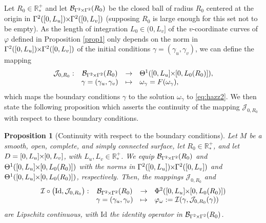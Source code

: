\documentclass{article}
\newcommand{\I}{\mathcal{I}}
\newcommand{\PLH}{{\mkern-1mu\times\mkern-1mu}}
\newcommand{\Times}{\PLH}
\newcommand{\R}{\mathbb{R}}
\newcommand{\surf}{M}
\newcommand{\J}{\mathcal{J}}
\newtheorem{proposition}[theorem]{Proposition}
\theoremstyle{remark}
\theoremstyle{prpart}
\newcommand{\B}{\mathcal{B}}
\newcommand{\Id}{\mathrm{Id}}
\begin{document}
Let $R_0\in\R^+_\ast$ and let $\B_{\Gamma^2\Times \Gamma^2}(R_0)$ be the closed ball of radius $R_0$ centered at the origin in $\Gamma^2([0,L_u])\Times \Gamma^2([0,L_v])$ (supposing $R_0$ is large enough for this set not to be empty). As the length of integration $L_0\in(0,L_v]$ of the $v$-coordinate curves of $\varphi$ defined in Proposition \ref{prop1} only depends on the norm in $\Gamma^2([0,L_u])\Times \Gamma^2([0,L_v])$ of the initial conditions $\gamma=(\gamma_u,\gamma_v)$, we can define the mapping
\begin{equation}\label{eq:app-J}
\begin{array}{lccl}
 \J_{0,R_0} : &\B_{\Gamma^2\Times \Gamma^2}(R_0) &\to& \Theta^1([0,L_u]\Times[0,L_0(R_0)]),\\
  & \gamma=(\gamma_u,\gamma_v) &\mapsto& \omega_{\gamma} = F(\omega_{\gamma}),
\end{array}
\end{equation}
which maps the boundary conditions $\gamma$ to the solution $\omega_\gamma$ to \eqref{eq:hazz2}.
We then state the following proposition which asserts the continuity of the mapping $\J_{0,R_0}$ with respect to these boundary conditions.
\begin{proposition}[Continuity with respect to the boundary conditions]\label{prop:cont0}
Let $\surf$ be a smooth, open, complete, and simply connected surface, let $R_0\in\R_\ast^+$, and let $D=[0,L_u]\Times[0,L_v]$, with $L_u,L_v\in\R^+_\ast$. We equip $\B_{\Gamma^2\Times \Gamma^2}(R_0)$ and $\Theta^1([0,L_u]\Times[0,L_0(R_0)])$ with the norms in $\Gamma^2([0,L_u])\Times \Gamma^2([0,L_v])$ and $\Theta^1([0,L_u]\Times[0,L_0(R_0)])$, respectively. Then, the mappings $\J_{0,R_0}$ and
\begin{equation*}
\begin{array}{lccl}
\I\circ \big(\Id,\J_{0,R_0}\big): &\B_{\Gamma^2\Times \Gamma^2}(R_0) &\to& \Phi^2([0,L_u]\Times[0,L_0(R_0)])\\
  & \gamma=(\gamma_u,\gamma_v) &\mapsto& \varphi_{\omega}:=\I(\gamma,\J_{0,R_0}(\gamma))
\end{array}
\end{equation*}
are Lipschitz continuous, with $\Id$ the identity operator in $\B_{\Gamma^2\Times \Gamma^2}(R_0)$.
\end{proposition}
\end{document}
